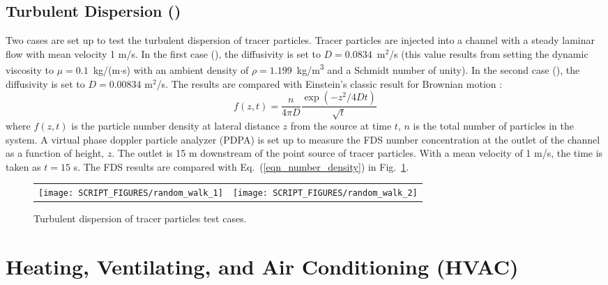 \documentclass[11pt]{book}
\begin{document}
\section{Turbulent Dispersion (\texorpdfstring{{}}{random\_walk}) }
\label{turbulent_dispersion}
\label{random_walk}

Two cases are set up to test the turbulent dispersion of tracer particles.  Tracer particles are injected into a channel with a steady laminar flow with mean velocity 1 m/s.  In the first case (), the diffusivity is set to $D=0.0834$~m$^2$/s (this value results from setting the dynamic viscosity to $\mu = 0.1$~kg/(m$\cdot$s) with an ambient density of $\rho=1.199$~\si{kg/m^3} and a Schmidt number of unity).  In the second case (), the diffusivity is set to $D=0.00834$ m$^2$/s.  The results are compared with Einstein's classic result for Brownian motion \cite{Gardiner:2004}:
\begin{equation}
\label{eqn_number_density}
f(z,t) = \frac{n}{4\pi D} \frac{\exp \left( -z^2/4Dt \right)}{\sqrt{t}}
\end{equation}
where $f(z,t)$ is the particle number density at lateral distance $z$ from the source at time $t$, $n$ is the total number of particles in the system.  A virtual phase doppler particle analyzer (PDPA) is set up to measure the FDS number concentration at the outlet of the channel as a function of height, $z$.  The outlet is 15 m downstream of the point source of tracer particles.  With a mean velocity of 1 m/s, the time is taken as $t = 15$ s.  The FDS results are compared with Eq.~(\ref{eqn_number_density}) in Fig.~\ref{random_walk_fig}.

\begin{figure}[ht]
\begin{tabular*}{\textwidth}{lr}
\texttt{[image: SCRIPT\_FIGURES/random\_walk\_1]} &
\texttt{[image: SCRIPT\_FIGURES/random\_walk\_2]}
\end{tabular*}
\caption[Turbulent dispersion of tracer particles]{Turbulent dispersion of tracer particles  test cases.}
\label{random_walk_fig}
\end{figure}




\chapter{Heating, Ventilating, and Air Conditioning (HVAC)}
\end{document}

